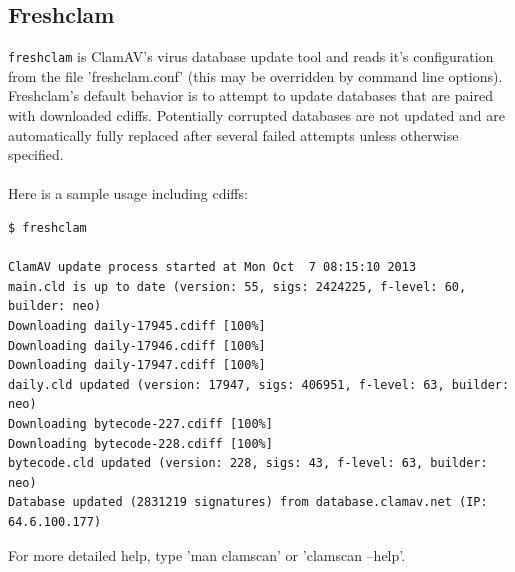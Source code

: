 \documentclass[a4paper,titlepage,12pt]{article}
\begin{document}
    \subsection{Freshclam}\label{sec:freshclam}
    \verb+freshclam+ is ClamAV's virus database update tool and reads it's
    configuration from the file 'freshclam.conf' (this may be
    overridden by command line options). Freshclam's default behavior is to
    attempt to update databases that are paired with downloaded cdiffs.
    Potentially corrupted databases are not updated and are automatically
    fully replaced after several failed attempts unless otherwise specified.
    \\\\
    Here is a sample usage including cdiffs:
{\footnotesize
    \begin{verbatim}
$ freshclam

ClamAV update process started at Mon Oct  7 08:15:10 2013
main.cld is up to date (version: 55, sigs: 2424225, f-level: 60, builder: neo)
Downloading daily-17945.cdiff [100%]
Downloading daily-17946.cdiff [100%]
Downloading daily-17947.cdiff [100%]
daily.cld updated (version: 17947, sigs: 406951, f-level: 63, builder: neo)
Downloading bytecode-227.cdiff [100%]
Downloading bytecode-228.cdiff [100%]
bytecode.cld updated (version: 228, sigs: 43, f-level: 63, builder: neo)
Database updated (2831219 signatures) from database.clamav.net (IP: 64.6.100.177)
    \end{verbatim}
}
    For more detailed help, type 'man clamscan' or 'clamscan --help'.
\end{document}
